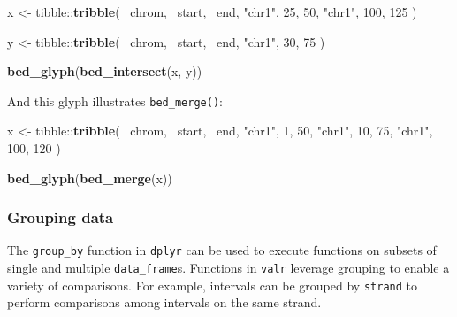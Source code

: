 \documentclass[9pt,a4paper]{extarticle}
\renewcommand{\KeywordTok}[1]{\textbf{{#1}}}
\renewcommand{\DecValTok}[1]{\textcolor[rgb]{0.00,0.00,1.00}{{#1}}}
\renewcommand{\StringTok}[1]{\textcolor[rgb]{0.87,0.00,0.00}{{#1}}}
\renewcommand{\NormalTok}[1]{{#1}}
\begin{document}
\begin{Highlighting}[]
\NormalTok{x <-}\StringTok{ }\NormalTok{tibble::}\KeywordTok{tribble}\NormalTok{(}
  \NormalTok{~chrom, ~start, ~end,}
  \StringTok{"chr1"}\NormalTok{, }\DecValTok{25}\NormalTok{,     }\DecValTok{50}\NormalTok{,}
  \StringTok{"chr1"}\NormalTok{, }\DecValTok{100}\NormalTok{,    }\DecValTok{125}
\NormalTok{)}

\NormalTok{y <-}\StringTok{ }\NormalTok{tibble::}\KeywordTok{tribble}\NormalTok{(}
  \NormalTok{~chrom, ~start, ~end,}
  \StringTok{"chr1"}\NormalTok{, }\DecValTok{30}\NormalTok{,     }\DecValTok{75}
\NormalTok{)}

\KeywordTok{bed_glyph}\NormalTok{(}\KeywordTok{bed_intersect}\NormalTok{(x, y))}
\end{Highlighting}

And this glyph illustrates \texttt{bed\_merge()}:

\begin{Highlighting}[]
\NormalTok{x <-}\StringTok{ }\NormalTok{tibble::}\KeywordTok{tribble}\NormalTok{(}
  \NormalTok{~chrom, ~start, ~end,}
  \StringTok{"chr1"}\NormalTok{,      }\DecValTok{1}\NormalTok{,      }\DecValTok{50}\NormalTok{,}
  \StringTok{"chr1"}\NormalTok{,      }\DecValTok{10}\NormalTok{,     }\DecValTok{75}\NormalTok{,}
  \StringTok{"chr1"}\NormalTok{,      }\DecValTok{100}\NormalTok{,    }\DecValTok{120}
\NormalTok{)}

\KeywordTok{bed_glyph}\NormalTok{(}\KeywordTok{bed_merge}\NormalTok{(x))}
\end{Highlighting}

\subsubsection*{Grouping data}\label{grouping-data}

The \texttt{group\_by} function in \texttt{dplyr} can be used to execute functions
on subsets of single and multiple \texttt{data\_frame}s. Functions in
\texttt{valr} leverage grouping to enable a variety of comparisons. For
example, intervals can be grouped by \texttt{strand} to perform
comparisons among intervals on the same strand.
\end{document}
